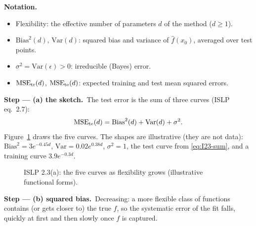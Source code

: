 \documentclass[11pt,a4paper]{article}
\numberwithin{equation}{questao}   %
\newenvironment{notacao}{\par\smallskip\noindent\textbf{Notation.}\begin{itemize}[leftmargin=1.4em,topsep=1pt,itemsep=0pt]\small}{\end{itemize}}
\newcommand{\passo}[2]{\par\smallskip\noindent\textbf{Step --- #1.}~#2}
\begin{document}
\begin{sol}
\begin{notacao}
\item Flexibility: the effective number of parameters $d$ of the method ($d\ge 1$).
\item $\mathrm{Bias}^2(d)$, $\mathrm{Var}(d)$: squared bias and variance of $\hat f(x_0)$, averaged over test points.
\item $\sigma^2=\mathrm{Var}(\epsilon)>0$: irreducible (Bayes) error.
\item $\mathrm{MSE}_{\rm tr}(d)$, $\mathrm{MSE}_{\rm te}(d)$: expected training and test mean squared errors.
\end{notacao}

\passo{(a) the sketch}{The test error is the sum of three curves (ISLP eq.~2.7):
\begin{equation}\label{eq:I23-sum}
\mathrm{MSE}_{\rm te}(d)=\mathrm{Bias}^2(d)+\mathrm{Var}(d)+\sigma^2 .
\end{equation}
Figure~\ref{fig:I23} draws the five curves. The shapes are illustrative (they are not data):
$\mathrm{Bias}^2=3e^{-0.45d}$, $\mathrm{Var}=0.02e^{0.38d}$, $\sigma^2=1$, the test curve from
\eqref{eq:I23-sum}, and a training curve $3.9e^{-0.3d}$.}

\begin{figure}[h]\centering
{}
\caption{ISLP 2.3(a): the five curves as flexibility grows (illustrative functional forms).}\label{fig:I23}
\end{figure}

\passo{(b) squared bias}{Decreasing: a more flexible class of functions contains (or gets
closer to) the true $f$, so the systematic error of the fit falls, quickly at first and then
slowly once $f$ is captured.}


\end{sol}
\end{document}
